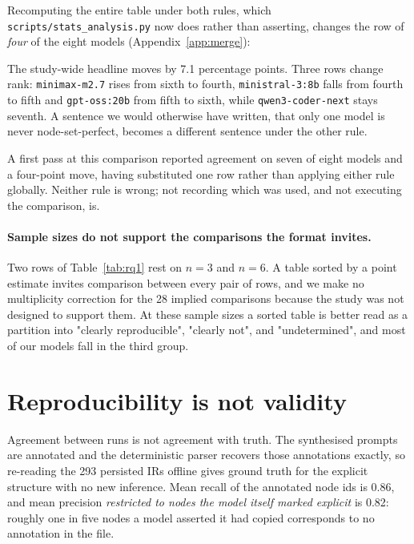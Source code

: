 \documentclass{article}
\begin{document}
Recomputing the entire table under both rules, which \texttt{scripts/stats\_analysis.py} now does rather than asserting, changes the row of \emph{four} of the eight models (Appendix~\ref{app:merge}):

The study-wide headline moves by 7.1 percentage points. Three rows change rank: \texttt{minimax-m2.7} rises from sixth to fourth, \texttt{ministral-3:8b} falls from fourth to fifth and \texttt{gpt-oss:20b} from fifth to sixth, while \texttt{qwen3-coder-next} stays seventh. A sentence we would otherwise have written, that only one model is never node-set-perfect, becomes a different sentence under the other rule.

A first pass at this comparison reported agreement on seven of eight models and a four-point move, having substituted one row rather than applying either rule globally. Neither rule is wrong; not recording which was used, and not executing the comparison, is.

\paragraph{Sample sizes do not support the comparisons the format invites.}
Two rows of Table~\ref{tab:rq1} rest on $n=3$ and $n=6$. A table sorted by a point estimate invites comparison between every pair of rows, and we make no multiplicity correction for the 28 implied comparisons because the study was not designed to support them. At these sample sizes a sorted table is better read as a partition into "clearly reproducible", "clearly not", and "undetermined", and most of our models fall in the third group.

\section{Reproducibility is not validity}
\label{sec:correctness}


Agreement between runs is not agreement with truth. The synthesised prompts are annotated and the deterministic parser recovers those annotations exactly, so re-reading the 293 persisted IRs offline gives ground truth for the explicit structure with no new inference. Mean recall of the annotated node ids is 0.86, and mean precision \emph{restricted to nodes the model itself marked explicit} is 0.82: roughly one in five nodes a model asserted it had copied corresponds to no annotation in the file.
\end{document}
